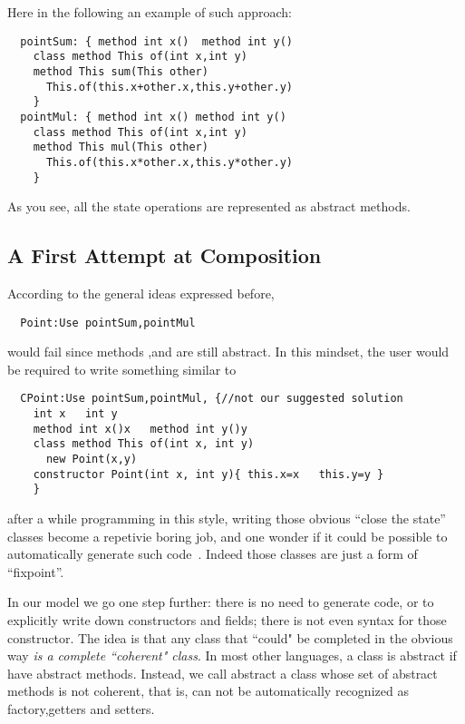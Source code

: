 Here in the following an example of such approach:

\begin{lstlisting}
  pointSum: { method int x()  method int y()
    class method This of(int x,int y)
    method This sum(This other)
      This.of(this.x+other.x,this.y+other.y)
    }
  pointMul: { method int x() method int y()
    class method This of(int x,int y)
    method This mul(This other)
      This.of(this.x*other.x,this.y*other.y)
    }
\end{lstlisting}

As you see, all the state operations are represented as abstract methods.

\subsection{A First Attempt at Composition}
According to the general ideas expressed before,
\begin{lstlisting}
  Point:Use pointSum,pointMul
\end{lstlisting}  

\noindent would fail since methods \Q@x@,\Q@y@ and \Q@of@ are still abstract.
In this mindset, the user would be required to write something similar to

\begin{lstlisting}
  CPoint:Use pointSum,pointMul, {//not our suggested solution
    int x   int y
    method int x()x   method int y()y
    class method This of(int x, int y)
      new Point(x,y)
    constructor Point(int x, int y){ this.x=x   this.y=y }
    }
\end{lstlisting}

\noindent after a while programming in this style, 
writing those obvious ``close the state'' classes become a
repetivie boring job, and one wonder
if it could be possible to automatically generate such code~\cite{wang2016classless}.
Indeed those classes are just a form of ``fixpoint''.

In our model we go one step further: there is no need to generate code, or to explicitly
write down constructors and fields; there is not even syntax for those
constructor.
The idea is that any class that ``could" be completed in the obvious way
\emph{is a complete ``coherent" class}.
In most other languages, a class is abstract if have abstract methods.
Instead, we call abstract a class whose set of abstract methods is not
coherent, that is, can not be automatically recognized as factory,getters and setters.
  
